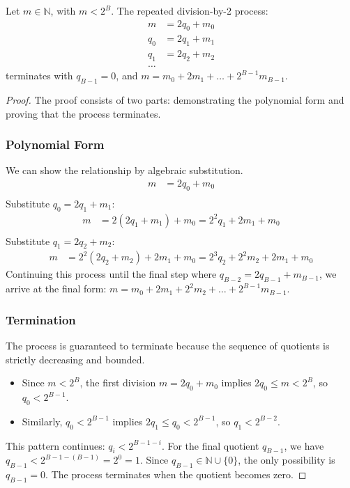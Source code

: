 \begin{proposition}
Let $m \in \mathbb{N}$, with $m < 2^B$. The repeated division-by-2 process:
\begin{align*}
m &= 2q_0 + m_0 \\
q_0 &= 2q_1 + m_1 \\
q_1 &= 2q_2 + m_2 \\
\dots
\end{align*}
terminates with $q_{B-1} = 0$, and $m = m_0 + 2m_1 + \dots + 2^{B-1}m_{B-1}$.
\end{proposition}
\begin{proof}
The proof consists of two parts: demonstrating the polynomial form and proving that the process terminates.

\subsubsection*{Polynomial Form}
We can show the relationship by algebraic substitution.
\begin{align*}
m &= 2q_0 + m_0 \\
\end{align*}
Substitute $q_0 = 2q_1 + m_1$:
\begin{align*}
m &= 2(2q_1 + m_1) + m_0 = 2^2q_1 + 2m_1 + m_0 \\
\end{align*}
Substitute $q_1 = 2q_2 + m_2$:
\begin{align*}
m &= 2^2(2q_2 + m_2) + 2m_1 + m_0 = 2^3q_2 + 2^2m_2 + 2m_1 + m_0
\end{align*}
Continuing this process until the final step where $q_{B-2} = 2q_{B-1} + m_{B-1}$, we arrive at the final form: $m = m_0 + 2m_1 + 2^2m_2 + \dots + 2^{B-1}m_{B-1}$.

\subsubsection*{Termination}
The process is guaranteed to terminate because the sequence of quotients is strictly decreasing and bounded.
\begin{itemize}
    \item Since $m < 2^B$, the first division $m = 2q_0 + m_0$ implies $2q_0 \leq m < 2^B$, so $q_0 < 2^{B-1}$.
    \item Similarly, $q_0 < 2^{B-1}$ implies $2q_1 \leq q_0 < 2^{B-1}$, so $q_1 < 2^{B-2}$.
\end{itemize}
This pattern continues: $q_i < 2^{B-1-i}$.
For the final quotient $q_{B-1}$, we have $q_{B-1} < 2^{B-1-(B-1)} = 2^0 = 1$. Since $q_{B-1} \in \mathbb{N} \cup \{0\}$, the only possibility is $q_{B-1} = 0$. The process terminates when the quotient becomes zero.
\end{proof}


